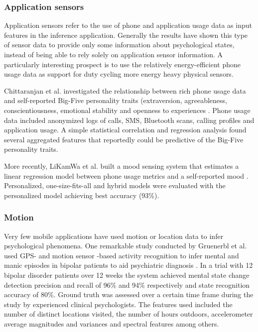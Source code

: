 \subsubsection{Application sensors}

Application sensors refer to the use of phone and application usage data
as input features in the inference application. Generally the results have shown
this type of sensor data to provide only some information about
psychological states, instead of being able to rely solely on application
sensor information. A particularly interesting prospect is to use the
relatively energy-efficient phone usage data as support for duty cycling
more energy heavy physical sensors.

Chittaranjan et al. investigated the relationship between rich phone usage data
and self-reported Big-Five personality traits (extraversion, agreeableness,
conscientiousness, emotional stability and openness to experiences
\cite{chittaranjan11mining}
\cite{chittaranjan11whos}. Phone usage
data included anonymized logs of calls, SMS, Bluetooth scans, calling profiles
and application usage. A simple statistical correlation and regression analysis
found several aggregated features that reportedly could be predictive of
the Big-Five personality traits.

More recently, LiKamWa et al. built a mood sensing system that
estimates a linear regression model between phone usage metrics and a
self-reported mood
\cite{likamwa13moodscope} \cite{likamwa11canyour}.
Personalized, one-size-fits-all and hybrid models were evaluated with the
personalized model achieving best accuracy (93\%).

\subsubsection{Motion}

Very few mobile applications have used motion or location data to infer
psychological phenomena. One remarkable study conducted by Gruenerbl et al.
used GPS- and motion sensor -based activity recognition to infer mental and
manic episodes in bipolar patients to aid psychiatric diagnosis
\cite{gruenerbl14using}. In a trial
with 12 bipolar disorder patients over 12 weeks the system achieved mental state
change detection precision and recall of 96\% and 94\% respectively and state
recognition accuracy of 80\%. Ground truth was assessed over a certain
time frame during the study by experienced clinical psychologists. The features
used included the number of distinct locations visited, the number of hours
outdoors, accelerometer average magnitudes and variances and spectral
features among others.

